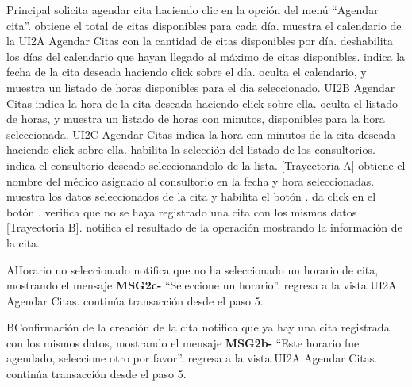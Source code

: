 \begin{UCtrayectoria}{Principal}
  \UCpaso[\UCactor] solicita agendar cita haciendo clic en la opción del menú “Agendar cita”.
  \UCpaso obtiene el total de citas disponibles para cada día.
  \UCpaso muestra el calendario de la UI2A Agendar Citas con la cantidad de citas disponibles por día.
  \UCpaso deshabilita los días del calendario que hayan llegado al máximo de citas disponibles.
  \UCpaso[\UCactor] indica la fecha de la cita deseada haciendo click sobre el día.
  \UCpaso oculta el calendario, y muestra un listado de horas disponibles para el día seleccionado. UI2B Agendar Citas
  \UCpaso[\UCactor] indica la hora de la cita deseada haciendo click sobre ella.
   \UCpaso oculta el listado de horas, y muestra un listado de horas con minutos, disponibles para la hora seleccionada. UI2C Agendar Citas
   \UCpaso[\UCactor] indica la hora con minutos de la cita deseada haciendo click sobre ella.
  \UCpaso habilita la selección del listado de los consultorios.
  \UCpaso[\UCactor] indica el consultorio deseado seleccionandolo de la lista. [Trayectoria A]
  \UCpaso obtiene el nombre del médico asignado al consultorio en la fecha y hora seleccionadas. 
  \UCpaso muestra los datos seleccionados de la cita y habilita el botón .
  \UCpaso[\UCactor] da click en el botón .
  \UCpaso verifica que no se haya registrado una cita con los mismos datos [Trayectoria B].
  \UCpaso notifica el resultado de la operación mostrando la información de la cita.
\end{UCtrayectoria}

\begin{UCtrayectoriaA}{A}{Horario no seleccionado}
  \UCpaso notifica que no ha seleccionado un horario de cita, mostrando el mensaje {\bf MSG2c-} “Seleccione un horario”.
  \UCpaso regresa a la vista UI2A Agendar Citas.
  \UCpaso continúa transacción desde el paso 5.
\end{UCtrayectoriaA}

\begin{UCtrayectoriaA}{B}{Confirmación de la creación de la cita}
  \UCpaso notifica que ya hay una cita registrada con los mismos datos, mostrando el mensaje {\bf MSG2b-} “Este horario fue agendado, seleccione otro por favor”.
  \UCpaso regresa a la vista UI2A Agendar Citas.
  \UCpaso continúa transacción desde el paso 5.
\end{UCtrayectoriaA}
